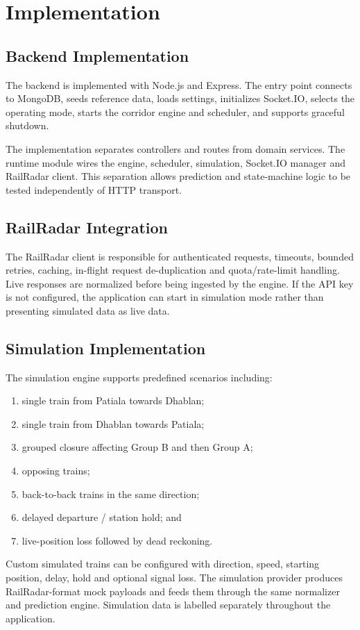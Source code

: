 \documentclass[11pt,a4paper]{report}
\begin{document}
\chapter{Implementation}
\section{Backend Implementation}
The backend is implemented with Node.js and Express. The entry point connects to MongoDB, seeds reference data, loads settings, initializes Socket.IO, selects the operating mode, starts the corridor engine and scheduler, and supports graceful shutdown.

The implementation separates controllers and routes from domain services. The runtime module wires the engine, scheduler, simulation, Socket.IO manager and RailRadar client. This separation allows prediction and state-machine logic to be tested independently of HTTP transport.

\section{RailRadar Integration}
The RailRadar client is responsible for authenticated requests, timeouts, bounded retries, caching, in-flight request de-duplication and quota/rate-limit handling. Live responses are normalized before being ingested by the engine. If the API key is not configured, the application can start in simulation mode rather than presenting simulated data as live data.

\section{Simulation Implementation}
The simulation engine supports predefined scenarios including:
\begin{enumerate}
  \item single train from Patiala towards Dhablan;
  \item single train from Dhablan towards Patiala;
  \item grouped closure affecting Group B and then Group A;
  \item opposing trains;
  \item back-to-back trains in the same direction;
  \item delayed departure / station hold; and
  \item live-position loss followed by dead reckoning.
\end{enumerate}
Custom simulated trains can be configured with direction, speed, starting position, delay, hold and optional signal loss. The simulation provider produces RailRadar-format mock payloads and feeds them through the same normalizer and prediction engine. Simulation data is labelled separately throughout the application.
\end{document}
